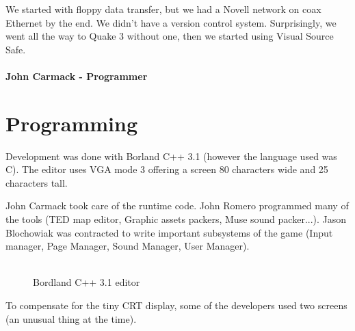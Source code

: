 \documentclass[book.tex]{subfiles}
\begin{document}
 \begin{fancyquotes}
We started with floppy data transfer, but we had a Novell network on coax Ethernet by the end. We didn't have a version control system.  Surprisingly, we went all the way to Quake 3 without one, then we started using Visual Source Safe.\\
 \\
\textbf{John Carmack - Programmer}
\end{fancyquotes}


























\section{Programming}



Development was done with Borland C++ 3.1 (however the language used was C). The editor uses VGA mode 3 offering a screen 80 characters wide and 25 characters tall.\\
\par
John Carmack took care of the runtime code. John Romero programmed many of the tools (TED map editor, Graphic assets packers, Muse sound packer...). Jason Blochowiak was contracted to write important subsystems of the game (Input manager, Page Manager, Sound Manager, User Manager).\\
\\
\begin{figure}[H]
\centering
\caption{Bordland C++ 3.1 editor}
\end{figure}


To compensate for the tiny CRT display, some of the developers used two screens (an unusual thing at the time).\\
\end{document}
